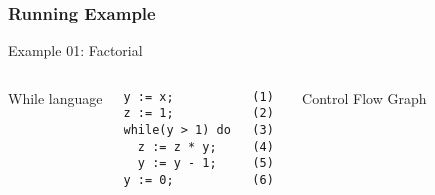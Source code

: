 \begin{frame}[fragile]
  \frametitle{Running Example}
  
  \begin{center}
  	\large Example 01: Factorial
  \end{center}
  
  \begin{columns}
While language
    
\begin{verbatim}
y := x;           (1)
z := 1;           (2)
while(y > 1) do   (3)
  z := z * y;     (4) 
  y := y - 1;     (5) 
y := 0;           (6) 
\end{verbatim}
\pause Control Flow Graph

\end{columns}
\end{frame}